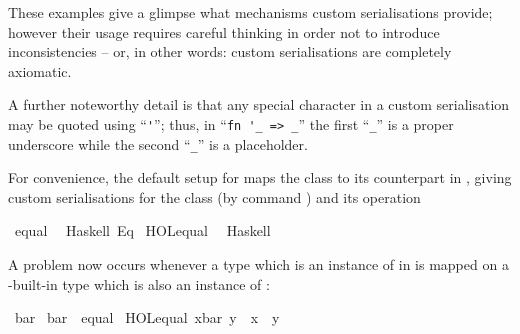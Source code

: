 \begin{isabellebody}
\begin{isamarkuptext}
  These examples give a glimpse what mechanisms custom serialisations
  provide; however their usage requires careful thinking in order not
  to introduce inconsistencies -- or, in other words: custom
  serialisations are completely axiomatic.

  A further noteworthy detail is that any special character in a
  custom serialisation may be quoted using ``\verb|'|''; thus,
  in ``\verb|fn '_ => _|'' the first ``\verb|_|'' is a
  proper underscore while the second ``\verb|_|'' is a
  placeholder.%
\end{isamarkuptext}%
\isamarkuptrue%
%
\isamarkuptrue%
%
\begin{isamarkuptext}%
For convenience, the default  setup for 
  maps the  class to its counterpart in ,
  giving custom serialisations for the class  (by command
  \hypertarget{command.code-class}{\hyperlink{command.code-class}{\mbox{}}}) and its operation %
\end{isamarkuptext}%
\isamarkuptrue%
%
\isadelimquotett
%
\endisadelimquotett
%
\isatagquotett
{}\isamarkupfalse%
\ equal\isanewline
\ \ {\isacharparenleft}Haskell\ {\isachardoublequoteopen}Eq{\isachardoublequoteclose}{\isacharparenright}\isanewline
\isanewline
{}\isamarkupfalse%
\ {\isachardoublequoteopen}HOL{\isachardot}equal{\isachardoublequoteclose}\isanewline
\ \ {\isacharparenleft}Haskell\ \ {}\ {\isachardoublequoteopen}{\isacharequal}{\isacharequal}{\isachardoublequoteclose}{\isacharparenright}%
\endisatagquotett
{\isafoldquotett}%
%
\isadelimquotett
%
\endisadelimquotett
%
\begin{isamarkuptext}%
\noindent A problem now occurs whenever a type which is an instance
  of  in  is mapped on a -built-in type which is also an instance of 
  :%
\end{isamarkuptext}%
\isamarkuptrue%
%
\isadelimquote
%
\endisadelimquote
%
\isatagquote
{}\isamarkupfalse%
\ bar\isanewline
\isanewline
{}\isamarkupfalse%
\ bar\ {\isacharcolon}{\isacharcolon}\ equal\isanewline
{}\isanewline
\isanewline
{}\isamarkupfalse%
\ {\isachardoublequoteopen}HOL{\isachardot}equal\ {\isacharparenleft}x{\isasymColon}bar{\isacharparenright}\ y\ {\isasymlongleftrightarrow}\ x\ {\isacharequal}\ y{\isachardoublequoteclose}\isanewline

\end{isabellebody}
